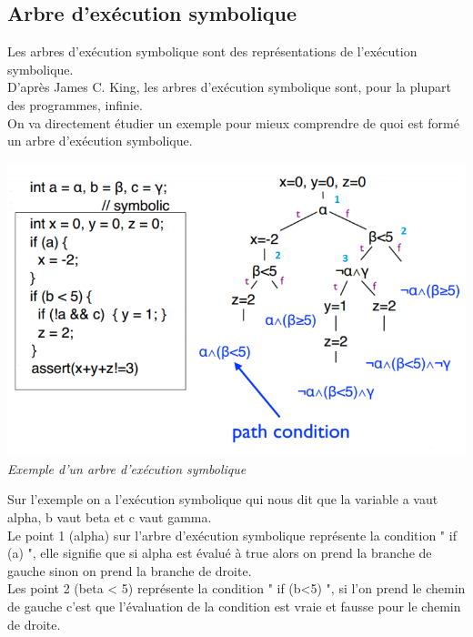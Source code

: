 \documentclass[a4paper,twoside,12pt,openright]{report}
\begin{document}
\subsection{Arbre d'exécution symbolique}

Les arbres d’exécution symbolique sont des représentations de l’exécution symbolique.\\

D’après James C. King, les arbres d’exécution symbolique sont, pour la plupart des programmes, infinie.\cite{ref16}\\
On va directement étudier un exemple pour mieux comprendre de quoi est formé un arbre d’exécution symbolique.\\

\begin{center}
\includegraphics[scale=0.8]{Image/ExempleArbreExecutionSymbolique.png}\\
\itshape{Exemple d'un arbre d'exécution symbolique \cite{ref15}}
\end{center}

Sur l’exemple on a l’exécution symbolique qui nous dit que la variable a vaut alpha, b vaut beta et c vaut gamma.\\

Le point 1 (alpha) sur l’arbre d’exécution symbolique représente la condition " if (a) ", elle signifie que si alpha est évalué à true alors on prend la branche de gauche sinon on prend la branche de droite.\\

Les point 2 (beta < 5) représente la condition " if (b<5) ", si l’on prend le chemin de gauche c’est que l’évaluation de la condition est vraie et fausse pour le chemin de droite.\\
\end{document}
